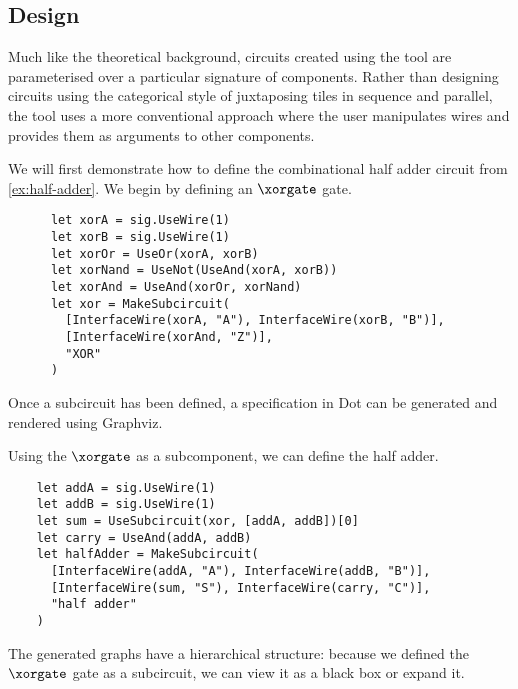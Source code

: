 \subsection{Design}

Much like the theoretical background, circuits created using the tool are
parameterised over a particular signature of components.
Rather than designing circuits using the categorical style of juxtaposing
tiles in sequence and parallel, the tool uses a more conventional approach
where the user manipulates wires and provides them as arguments to other
components.

\begin{example}
  We will first demonstrate how to define the combinational half adder circuit
  from \cref{ex:half-adder}.
  We begin by defining an \(\xorgate\) gate.
  \begin{lstlisting}
      let xorA = sig.UseWire(1)
      let xorB = sig.UseWire(1)
      let xorOr = UseOr(xorA, xorB)
      let xorNand = UseNot(UseAnd(xorA, xorB))
      let xorAnd = UseAnd(xorOr, xorNand)
      let xor = MakeSubcircuit(
        [InterfaceWire(xorA, "A"), InterfaceWire(xorB, "B")],
        [InterfaceWire(xorAnd, "Z")],
        "XOR"
      )
    \end{lstlisting}

  Once a subcircuit has been defined, a specification in Dot can be generated
  and rendered using Graphviz.

  \begin{center}
    
  \end{center}

  Using the \(\xorgate\) as a subcomponent, we can define the half adder.

  \begin{lstlisting}
    let addA = sig.UseWire(1)
    let addB = sig.UseWire(1)
    let sum = UseSubcircuit(xor, [addA, addB])[0]
    let carry = UseAnd(addA, addB)
    let halfAdder = MakeSubcircuit(
      [InterfaceWire(addA, "A"), InterfaceWire(addB, "B")],
      [InterfaceWire(sum, "S"), InterfaceWire(carry, "C")],
      "half adder"
    )
    \end{lstlisting}

  The generated graphs have a hierarchical structure: because we defined the
  \(\xorgate\) gate as a subcircuit, we can view it as a black box or
  expand it.

  \begin{center}
    

    \vspace{1em}

    
  \end{center}
\end{example}

